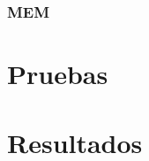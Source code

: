 \subsection{MEM}

 
 












\chapter{Pruebas}
\label{cap:pruebas}

\chapter{Resultados}
\label{cap:resultados}